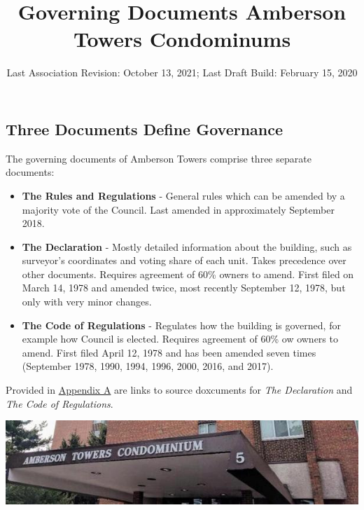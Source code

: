 \documentclass[
  14pt,
]{book}
\title{Governing Documents Amberson Towers Condominums}
\author{}
\date{\vspace{-2.5em}Last Association Revision: October 13, 2021; Last Draft Build: February 15, 2020}
\begin{document}
\maketitle

{
\setcounter{tocdepth}{1}
\tableofcontents
}
\hypertarget{section}{%
\chapter*{}\label{section}}

\hypertarget{three-documents-define-governance}{%
\section*{Three Documents Define Governance}\label{three-documents-define-governance}}

The governing documents of Amberson Towers comprise three separate documents:

\begin{itemize}
\item
  \textbf{The Rules and Regulations} - General rules which can be amended by a majority vote of the Council. Last amended in approximately September 2018.
\item
  \textbf{The Declaration} - Mostly detailed information about the building, such as surveyor's coordinates and voting share of each unit. Takes precedence over other documents. Requires agreement of 60\% owners to amend. First filed on March 14, 1978 and amended twice, most recently September 12, 1978, but only with very minor changes.
\item
  \textbf{The Code of Regulations} - Regulates how the building is governed, for example how Council is elected. Requires agreement of 60\% ow owners to amend. First filed April 12, 1978 and has been amended seven times (September 1978, 1990, 1994, 1996, 2000, 2016, and 2017).
\end{itemize}

Provided in \protect\hyperlink{documents}{Appendix A} are links to source doxcuments for \emph{The Declaration} and \emph{The Code of Regulations}.

\includegraphics{amber3.jpg}
\end{document}
